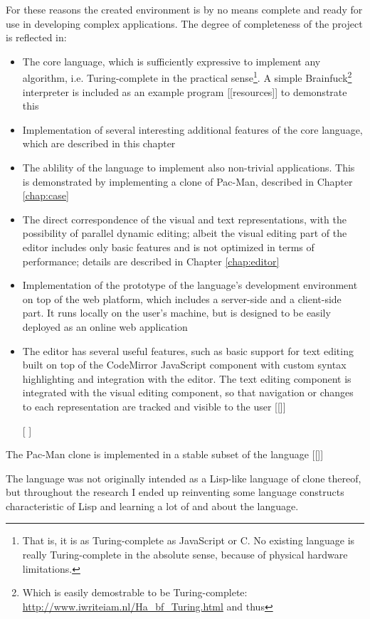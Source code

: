 For these reasons the created environment is by no means complete and ready for use in developing complex applications. The degree of completeness of the project is reflected in:
\begin{itemize}
    \item The core language, which is sufficiently expressive to implement any algorithm, i.e. Turing-complete in the practical sense\footnote{That is, it is as Turing-complete as JavaScript or C. No existing language is really Turing-complete in the absolute sense, because of physical hardware limitations.}. A simple Brainfuck\footnote{Which is easily demostrable to be Turing-complete: \url{http://www.iwriteiam.nl/Ha_bf_Turing.html} and thus} interpreter is included as an example program [[resources]] to demonstrate this
    \item Implementation of several interesting additional features of the core language, which are described in this chapter
    \item The ablility of the language to implement also non-trivial applications. This is demonstrated by implementing a clone of Pac-Man, described in Chapter \ref{chap:case}
    \item The direct correspondence of the visual and text representations, with the possibility of parallel dynamic editing; albeit the visual editing part of the editor includes only basic features and is not optimized in terms of performance; details are described in Chapter \ref{chap:editor}
    \item Implementation of the prototype of the language's development environment on top of the web platform, which includes a server-side and a client-side part. It runs locally on the user's machine, but is designed to be easily deployed as an online web application
    \item The editor has several useful features, such as basic support for text editing built on top of the CodeMirror JavaScript component with custom syntax highlighting and integration with the editor. The text editing component is integrated with the visual editing component, so that navigation or changes to each representation are tracked and visible to the user [[]]
    \item [[]]
\end{itemize}

The Pac-Man clone is implemented in a stable subset of the language [[]]

The language was not originally intended as a Lisp-like language of clone thereof, but throughout the research I ended up reinventing some language constructs characteristic of Lisp and learning a lot of and about the language.

